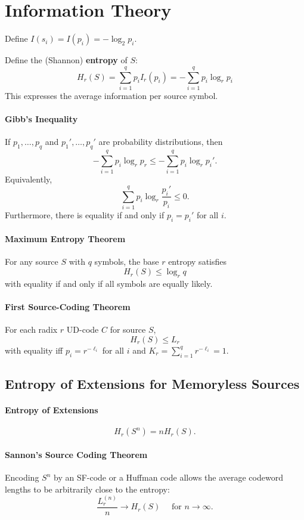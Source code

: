 \section{Information Theory}
Define \(I(s_i) = I(p_i) = -\log_2 p_i\).

Define the (Shannon) \textbf{entropy} of \(S\):
\[H_r(S) = \sum_{i = 1}^{q} p_iI_r(p_i) = -\sum_{i=1}^{q}p_i \log_r p_i\]
This expresses the average information per source symbol.

\paragraph{Gibb's Inequality}
If \(p_1, \dots, p_q\) and \(p_1', \dots, p_q'\) are probability distributions, then
\[-\sum_{i=1}^{q}p_i \log_r p_r \leq - \sum_{i=1}^{q}p_i \log_r p_i'.\]
Equivalently,
\[\sum_{i=1}^{q}p_i \log_r \frac{p_i'}{p_i} \leq 0.\]
Furthermore, there is equality if and only if \(p_i = p_i'\) for all \(i\).

\paragraph{Maximum Entropy Theorem}
For any source \(S\) with \(q\) symbols, the base \(r\) entropy satisfies
\[H_r(S) \leq \log_r q\]
with equality if and only if all symbols are equally likely.

\paragraph{First Source-Coding Theorem}
For each radix \(r\) UD-code \(C\) for source \(S\),
\[H_r(S) \leq L_r\]
with equality iff \(p_i = r^{-\ell_i}\) for all \(i\) and \(K_r = \displaystyle{\sum_{i=1}^{q} r^{-\ell_i} = 1}\).


\subsection{Entropy of Extensions for Memoryless Sources}
\paragraph{Entropy of Extensions}
\[H_r(S^n) = nH_r(S).\]

\paragraph{Sannon's Source Coding Theorem}
Encoding \(S^n\) by an SF-code or a Huffman code allows the average codeword lengths to be arbitrarily close to the entropy:
\[\frac{L_r^{(n)}}{n} \to H_r(S) \quad \text{ for } n \to \infty.\]

